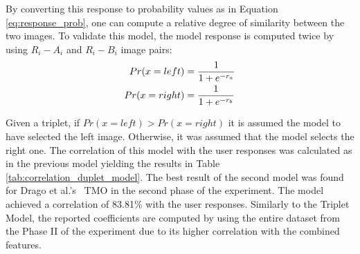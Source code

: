 By converting this response to probability values as in Equation \ref{eq:response_prob}, one can compute a relative degree of similarity between the two images. To validate this model, the model response is computed twice by using $R_i - A_i$ and $R_i - B_i$ image pairs:
\begin{align}
    Pr(x = left) &= {{1} \over {1 + e^{-r_a}}} \\
    Pr(x = right) &= {{1} \over {1 + e^{-r_b}}}
\end{align}


Given a triplet, if $Pr(x = left) > Pr(x =right)$ it is assumed the model to have selected the left image. Otherwise, it was assumed that the model selects the right one. The correlation of this model with the user responses was calculated as in the previous model yielding the results in Table \ref{tab:correlation_duplet_model}. The best result of the second model was found for Drago et al.’s~\cite{drago2003adaptive} TMO in the second phase of the experiment. The model achieved a correlation of 83.81\% with the user responses. Similarly to the Triplet Model, the reported coefficients are computed by using the entire dataset from the Phase II of the experiment due to its higher correlation with the combined features.


